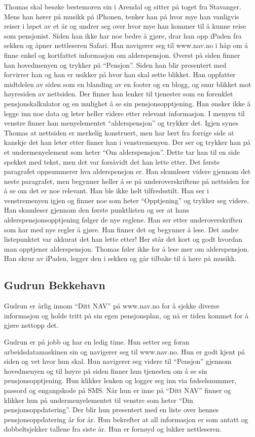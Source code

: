 \documentclass[informationsecurity]{gucmasterproject}
\begin{document}
Thomas skal besøke bestemoren sin i Arendal og sitter på toget fra Stavanger. Mens han hører på musikk på iPhonen, tenker han på hvor mye han vanligvis reiser i løpet av et år og undrer seg over hvor mye han kommer til å kunne reise som pensjonist. Siden han ikke har noe bedre å gjøre, drar han opp iPaden fra sekken og åpner nettleseren Safari. Han navigerer seg til www.nav.no i håp om å finne enkel og kortfattet informasjon om alderspensjon. Øverst på siden finner han hovedmenyen og trykker på “Pensjon”. Siden han blir presentert med forvirrer han og han er usikker på hvor han skal sette blikket. Han oppfatter midtdelen av siden som en blanding av en footer og en blogg, og snur blikket mot høyresiden av nettsiden. Der finner han lenker til tjenester som en forenklet pensjonskalkulator og en mulighet å se sin pensjonsopptjening. Han ønsker ikke å legge inn noe data og leter heller videre etter relevant informasjon. I menyen til venstre finner han menyelementet “alderspensjon” og trykker det. Igjen synes Thomas at nettsiden er merkelig konstruert, men har lært fra forrige side at kanskje det han leter etter finner han i venstremenyen. Der ser og trykker han på et undermenyelement som heter “Om alderspensjon”. Dette tar han til en side spekket med tekst, men det var forsåvidt det han lette etter. Det første paragrafet oppsummerer hva alderspensjon er. Han skumleser videre gjennom det neste paragrafet, men begynner heller å se på underoverskriftene på nettsiden for å se om det er noe relevant. Han ble ikke helt tilfredsstilt. Han ser i venstremenyen igjen og finner noe som heter “Opptjening” og trykker seg videre. Han skumleser gjennom den første punktlisten og ser at hans alderspensjonsopptjening følger de nye reglene. Han ser etter underoverskriften som har med nye regler å gjøre. Han finner det og begynner å lese. Det andre listepunktet var akkurat det han lette etter! Her står det kort og godt hvordan man opptjener alderspensjon. Thomas føler ikke for å lese mer om alderspensjon. Han skrur av iPaden, legger den i sekken og går tilbake til å høre på musikk.

\subsection{Gudrun Bekkehavn}
Gudrun er årlig innom “Ditt NAV” på www.nav.no for å sjekke diverse informasjon og holde tritt på sin egen pensjonsplan, og nå er tiden kommet for å gjøre nettopp det.

Gudrun er på jobb og har en ledig time. Hun setter seg foran arbeidsdatamaskinen sin og navigerer seg til www.nav.no. Hun er godt kjent på siden og vet hvor hun skal. Hun navigerer seg videre til “Pensjon” gjennom hovedmenyen og til høyre på siden finner hun tjenesten om å se sin pensjonsopptjening. Hun klikker lenken og logger seg inn via fødselsnummer, passord og engangskode på SMS. Når hun er inne på “Ditt NAV” finner og klikker hun på undermenyelementet til venstre som heter “Din pensjonsoppdatering”. Der blir hun presentert med en liste over hennes pensjonsoppdatering år for år. Hun bekrefter at all informasjon er som antatt og dobbeltsjekker tallene fra siste år. Hun er fornøyd og lukker nettleseren.
\end{document}
